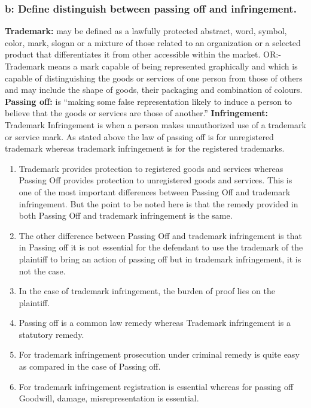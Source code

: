 \documentclass[14 pt, letterpaper]{extarticle}
\begin{document}
\begin{justify}
	\subsubsection*{b: Define distinguish between passing off and infringement.}
	\textbf{Trademark:} may be defined as a lawfully protected abstract, word, symbol, color, mark, slogan or a mixture of those related to an organization or a selected product that differentiates it from other accessible within the market. OR:- Trademark means a mark capable of being represented graphically and which is capable of distinguishing the goods or services of one person from those of others and may include the shape of goods, their packaging and combination of colours.
	\textbf{Passing off:} is \enquote{making some false representation likely to induce a person to believe that the goods or services are those of another.}
	\linebreak
	\textbf{Infringement:} Trademark Infringement is when a person makes unauthorized use of a trademark or service mark. As stated above the law of passing off is for unregistered trademark whereas trademark infringement is for the registered trademarks.
	\begin{enumerate}
		\item Trademark provides protection to registered goods and services whereas Passing Off provides protection to unregistered goods and services. This is one of the most important differences between Passing Off and trademark infringement. But the point to be noted here is that the remedy provided in both Passing Off and trademark infringement is the same.
		\item The other difference between Passing Off and trademark infringement is that in Passing off it is not essential for the defendant to use the trademark of the plaintiff to bring an action of passing off but in trademark infringement, it is not the case.
		\item In the case of trademark infringement, the burden of proof lies on the plaintiff.
		\item Passing off is a common law remedy whereas Trademark infringement is a statutory remedy.
		\item For trademark infringement prosecution under criminal remedy is quite easy as compared in the case of Passing off.
		\item For trademark infringement registration is essential whereas for passing off Goodwill, damage, misrepresentation is essential.
	\end{enumerate}
		

\end{justify}
\end{document}
